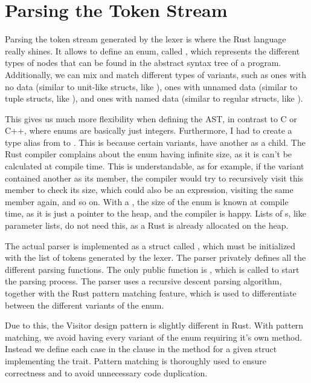 \newcommand{\bnfTerm}[1]{\langle\, \text{#1}\, \rangle}

\section{Parsing the Token Stream}

Parsing the token stream generated by the lexer is where the Rust language
really shines. It allows to define an enum, called , which
represents the different types of nodes that can be found in the abstract syntax
tree of a  program. Additionally, we can mix and match different
types of variants, such as ones with no data (similar to unit-like structs, like
), ones with unnamed data (similar to tuple structs, like
), and ones with named data (similar to regular
structs, like ).

This gives us much more flexibility when defining the AST, in contrast to C or
C++, where enums are basically just integers. Furthermore, I had to create a
type alias from  to . This is because
certain  variants, have another  as a child. The
Rust compiler complains about the enum having infinite size, as it is can't be
calculated at compile time. This is understandable, as for example, if the
 variant contained another  as its
member, the compiler would try to recursively visit this member to check its
size, which could also be an expression, visiting the same member again, and so
on. With a , the size of the enum is known at compile time, as it is
just a pointer to the heap, and the compiler is happy. Lists of s,
like parameter lists, do not need this, as a Rust  is already
allocated on the heap.

The actual parser is implemented as a struct called , which must be
initialized with the list of tokens generated by the lexer. The parser privately
defines all the different parsing functions. The only public function is
, which is called to start the parsing process. The parser uses a
recursive descent parsing algorithm, together with the Rust pattern matching
feature, which is used to differentiate between the different variants of the
 enum.

Due to this, the Visitor design pattern is slightly different in Rust. With
pattern matching, we avoid having every variant of the  enum
requiring it's own  method. Instead we define each case in the
 clause in the  method for a given struct implementing
the  trait. Pattern matching is thoroughly used to ensure
correctness and to avoid unnecessary code duplication.

